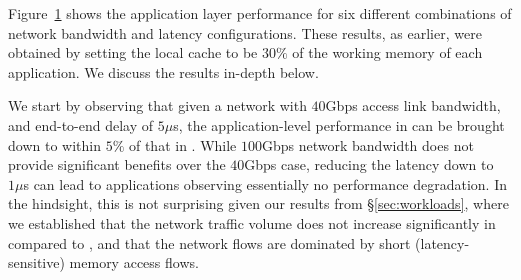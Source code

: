 %
\begin{figure}

  \centering
  \caption{\small{}}
  \label{fig:latb}
\end{figure}
%
Figure~\ref{fig:latb} shows the application layer performance for six different combinations of network bandwidth and latency configurations. These results, as earlier, were obtained by setting the local cache to be $30\%$ of the working memory of each application. We discuss the results in-depth below. 

We start by observing that given a network with $40$Gbps access link bandwidth, and end-to-end delay of $5\mu$s, the application-level performance in \dis can be brought down to within $5\%$ of that in \pdis. While $100$Gbps network bandwidth does not provide significant benefits over the $40$Gbps case, reducing the latency down to $1\mu$s can lead to applications observing essentially no performance degradation. In the hindsight, this is not surprising given our results from \S\ref{sec:workloads}, where we established that the network traffic volume does not increase significantly in \dis compared to \pdis, and that the network flows are dominated by short (latency-sensitive) memory access flows. 

